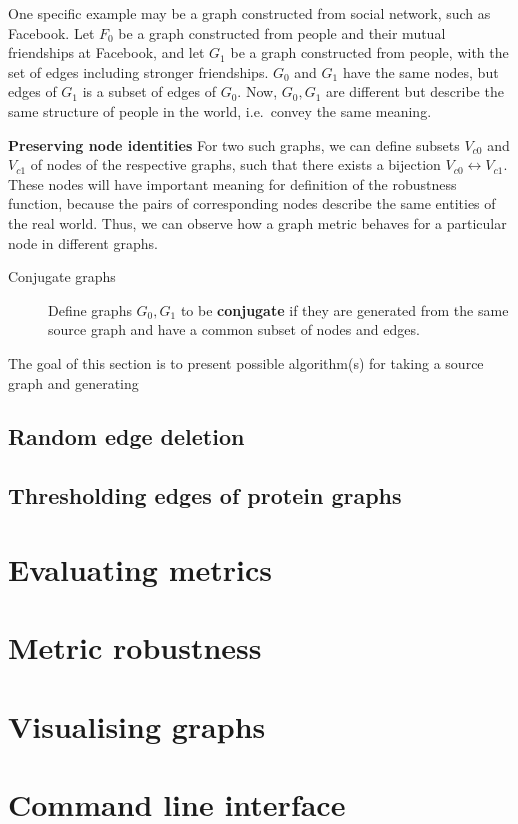 One specific example may be a graph constructed from social network, such as Facebook.
Let $F_0$ be a graph constructed from people and their mutual friendships at Facebook, and let $G_1$ be a graph constructed from people, with the set of edges including stronger friendships. $G_0$ and $G_1$ have the same nodes, but edges of $G_1$ is a subset of edges of $G_0$.
Now, $G_0, G_1$ are different but describe the same structure of people in the world, i.e.\ convey the same meaning.

\textbf{Preserving node identities} For two such graphs, we can define subsets $V_{c0}$ and $V_{c1}$ of nodes of the respective graphs, such that there exists a bijection $V_{c0} \leftrightarrow V_{c1}$.
These nodes will have important meaning for definition of the robustness function, because the pairs of corresponding nodes describe the same entities of the real world.
Thus, we can observe how a graph metric behaves for a particular node in different graphs.

\begin{description}
    \item[Conjugate graphs] Define graphs $G_0, G_1$ to be \textbf{conjugate} if they are generated from the same source graph and have a common subset of nodes and edges.
\end{description}

The goal of this section is to present possible algorithm(s) for taking a source graph and generating

\subsection{Random edge deletion}

\subsection{Thresholding edges of protein graphs}


\section{Evaluating metrics}


\section{Metric robustness}


\section{Visualising graphs}


\section{Command line interface}

